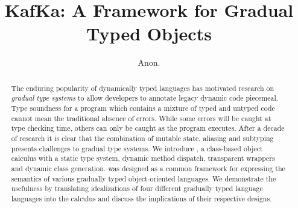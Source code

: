 \documentclass[a4paper,USenglish]{tex/lipics-v2016}
\begin{document}
\title{KafKa: A Framework for Gradual Typed Objects}
\author{Anon.}


\EventLogo{}


\maketitle

\begin{abstract}
The enduring popularity of dynamically typed languages has motivated
research on \emph{gradual type systems} to allow developers to annotate
legacy dynamic code piecemeal. Type soundness for a program which contains a
mixture of typed and untyped code cannot mean the traditional absence of
errors. While some errors will be caught at type checking time, others can only
be caught as the program executes. After a decade of research it is clear
that the combination of mutable state, aliasing and subtyping presents
challenges to gradual type systems.  We introduce \kafka, a class-based
object calculus with a static type system, dynamic method dispatch,
transparent wrappers and dynamic class generation. \kafka was designed as a
common framework for expressing the semantics of various gradually typed
object-oriented languages. We demonstrate the usefulness by translating
idealizations of four different gradually typed language languages into the
calculus and discuss the implications of their respective designs.
\end{abstract}
\end{document}
